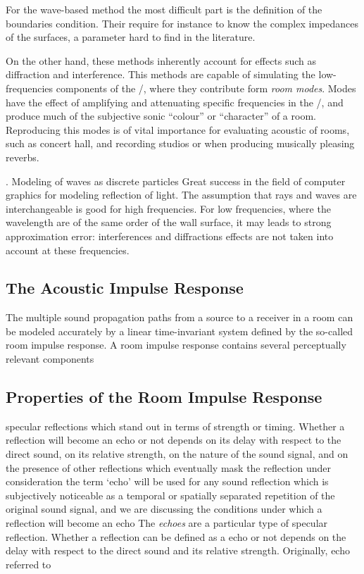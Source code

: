 For the wave-based method the most difficult part is the definition of the boundaries condition.
Their require for instance to know the complex impedances of the surfaces, a parameter hard to find in the literature.

On the other hand, these methods inherently account for effects such as diffraction and interference.
This methods are capable of simulating the low-frequencies components of the \RIR/, where they contribute form \textit{room modes}.
Modes have the effect of amplifying and attenuating specific frequencies in the \RIR/, and produce much of the subjective sonic “colour” or “character” of a room.
Reproducing this modes is of vital importance for evaluating acoustic of rooms, such as concert hall, and recording studios or when producing musically pleasing reverbs.



. Modeling of waves as discrete particles Great success in the field of computer graphics for modeling reflection of light.
The assumption that rays and waves are interchangeable is good for high frequencies. For low frequencies, where the wavelength are of the same order
of the wall surface, it may leads to strong approximation error: interferences and diffractions effects are not taken into account at these frequencies\cite{Savioja2015goemetric}.



\subsection{The Acoustic Impulse Response}
The multiple sound propagation paths from a source to a receiver in a room can be
modeled accurately by a linear time-invariant system defined by the so-called room impulse response.
A room impulse response contains several perceptually relevant components


\subsection{Properties of the Room Impulse Response}
 specular reflections which stand out in terms of strength or timing.
Whether a reflection will become an echo or not depends on its delay with respect to the direct sound, on its relative strength, on the nature of the sound signal, and on the presence of other reflections which eventually mask the reflection under consideration
the term ‘echo’ will be used for any sound reflection which
is subjectively noticeable as a temporal or spatially separated repetition of the original sound signal, and we are discussing the conditions under which a reflection will become an echo
The \textit{echoes} are a particular type of specular reflection.
Whether a reflection can be defined as a echo or not depends
on the delay with respect to the direct sound and its relative strength.
Originally, echo referred to

